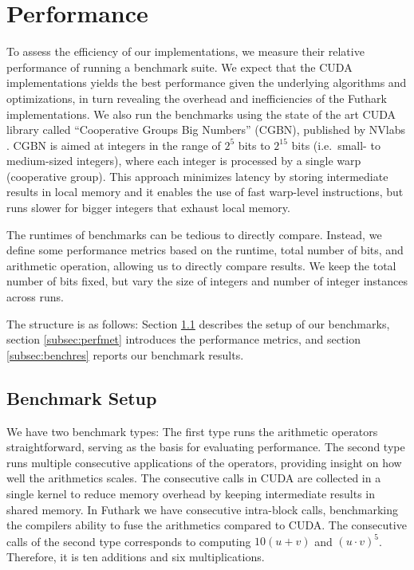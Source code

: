 \section{Performance}
\label{sec:per}

To assess the efficiency of our implementations, we measure their relative
performance of running a benchmark suite. We expect that the CUDA
implementations yields the best performance given the underlying algorithms and
optimizations, in turn revealing the overhead and inefficiencies of the Futhark
implementations. We also run the benchmarks using the state of the art CUDA
library called ``Cooperative Groups Big Numbers'' (CGBN), published by NVlabs
\cite{CGBN}. CGBN is aimed at integers in the range of $2^5$ bits to $2^{15}$
bits (i.e.\ small- to medium-sized integers), where each integer is processed by
a single warp (cooperative group). This approach minimizes latency by storing
intermediate results in local memory and it enables the use of fast warp-level
instructions, but runs slower for bigger integers that exhaust local memory.

The runtimes of benchmarks can be tedious to directly compare. Instead, we
define some performance metrics based on the runtime, total number of bits, and
arithmetic operation, allowing us to directly compare results. We keep the total
number of bits fixed, but vary the size of integers and number of integer
instances across runs.

The structure is as follows: Section \ref{subsec:benchset} describes the setup
of our benchmarks, section \ref{subsec:perfmet} introduces the performance
metrics, and section \ref{subsec:benchres} reports our benchmark results.

\subsection{Benchmark Setup}
\label{subsec:benchset}

We have two benchmark types: The first type runs the arithmetic operators
straightforward, serving as the basis for evaluating performance. The second
type runs multiple consecutive applications of the operators, providing insight
on how well the arithmetics scales. The consecutive calls in CUDA are collected
in a single kernel to reduce memory overhead by keeping intermediate results in
shared memory. In Futhark we have consecutive intra-block calls, benchmarking
the compilers ability to fuse the arithmetics compared to CUDA. The consecutive
calls of the second type corresponds to computing $10(u+v)$ and $(u\cdot
v)^5$. Therefore, it is ten additions and six multiplications.

